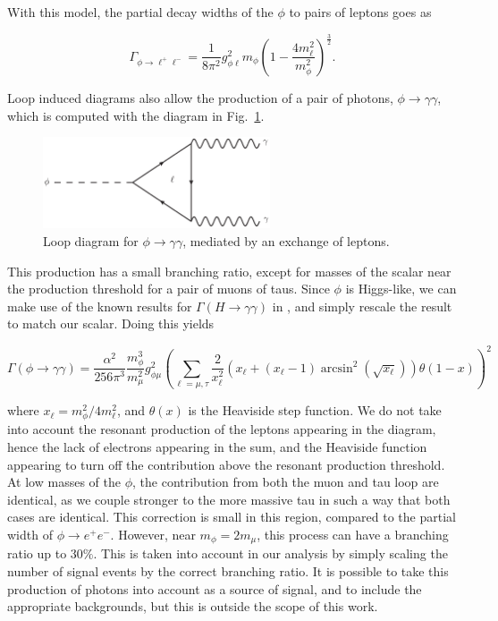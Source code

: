 With this model, the partial decay widths of the $\phi$ to pairs of leptons goes as

\begin{equation}
    \Gamma_{\phi \rightarrow \ell^+ \ell^-} = \frac{1}{8\pi^2} g_{\phi\ell}^2 m_\phi \left(1-\frac{4m_\ell^2}{m_\phi^2}\right)^{\frac{3}{2}}\textrm{.}
\end{equation}

Loop induced diagrams also allow the production of a pair of photons, $\phi \rightarrow \gamma \gamma$, which is computed with the diagram in Fig.\ \ref{fig:phi_gammagamma_loop}.

\begin{figure}[h]
    \centering
    \includegraphics[width = 0.6\textwidth]{Figures/feynman_diagrams/phi_gammagamma}
    \caption{Loop diagram for $\phi \rightarrow \gamma \gamma$, mediated by an exchange of leptons.}
    \label{fig:phi_gammagamma_loop}
\end{figure}

\noindent This production has a small branching ratio, except for masses of the scalar near the production threshold for a pair of muons of taus.
Since $\phi$ is Higgs-like, we can make use of the known results for $\Gamma\left(H \rightarrow \gamma \gamma\right)$ in \cite{Djouadi:2005gi}, and simply rescale the result to match our scalar.
Doing this yields

\begin{equation}
    \Gamma\left(\phi \rightarrow \gamma \gamma\right) = \frac{\alpha^2}{256 \pi^3} \frac{m_\phi^3}{m_\mu^2} g_{\phi \mu}^2 \left( \sum_{\ell = \mu, \tau} \frac{2}{x_\ell^2}\left( x_\ell + (x_\ell-1) \arcsin^2\left( \sqrt{x_\ell} \right) \right) \theta(1-x) \right)^2
\end{equation}

\noindent where $x_\ell = m_\phi^2 / 4 m_\ell^2$, and $\theta(x)$ is the Heaviside step function.
We do not take into account the resonant production of the leptons appearing in the diagram, hence the lack of electrons appearing in the sum, and the Heaviside function appearing to turn off the contribution above the resonant production threshold.
At low masses of the $\phi$, the contribution from both the muon and tau loop are identical, as we couple stronger to the more massive tau in such a way that both cases are identical.
This correction is small in this region, compared to the partial width of $\phi \rightarrow e^+ e^-$.
However, near $m_\phi = 2m_\mu$, this process can have a branching ratio up to $30\%$.
This is taken into account in our analysis by simply scaling the number of signal events by the correct branching ratio.
It is possible to take this production of photons into account as a source of signal, and to include the appropriate backgrounds, but this is outside the scope of this work.

